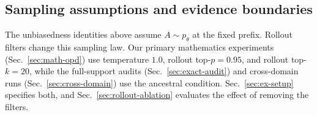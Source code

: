 
\subsection{Sampling assumptions and evidence boundaries}
\label{subsec:evidence}

The unbiasedness identities above assume $A\sim p_\theta$ at the fixed prefix.
Rollout filters change this sampling law. Our primary mathematics experiments (Sec.~\ref{sec:math-opd}) use
temperature $1.0$, rollout top-$p=0.95$, and rollout top-$k=20$, while the
full-support audits (Sec.~\ref{sec:exact-audit}) and cross-domain runs (Sec.~\ref{sec:cross-domain}) use the ancestral condition. Sec.~\ref{sec:ex-setup} specifies both, and
Sec.~\ref{sec:rollout-ablation} evaluates the effect of removing the filters.

